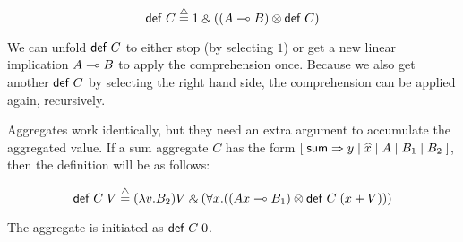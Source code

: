 \[
\compr{C} \defeq 1 \with ((A \lolli B) \otimes \compr{C})
\]

We can unfold $\mathsf{def} \; C$ to either stop (by selecting $1$) or get a new linear implication $A \multimap B$
to apply the comprehension once. Because we also get another $\mathsf{def} \; C$ by selecting the right hand side,
the comprehension can be applied again, recursively.

Aggregates work identically, but they need an extra argument to accumulate the aggregated value. If a sum aggregate $C$ has the form $[\;\mathsf{sum} \Rightarrow y \; | \; \widehat{x} \; | \; A \; | \; B_1 \; | \; B_2 \;]$, then the definition will be as follows:

\[
\compr{C} \; V \defeq (\lambda v. B_2)V \with (\forall x. ((Ax \lolli B_1) \otimes \compr{C} \; (x + V)))
\]

The aggregate is initiated as $\mathsf{def} \; C \; 0$.


